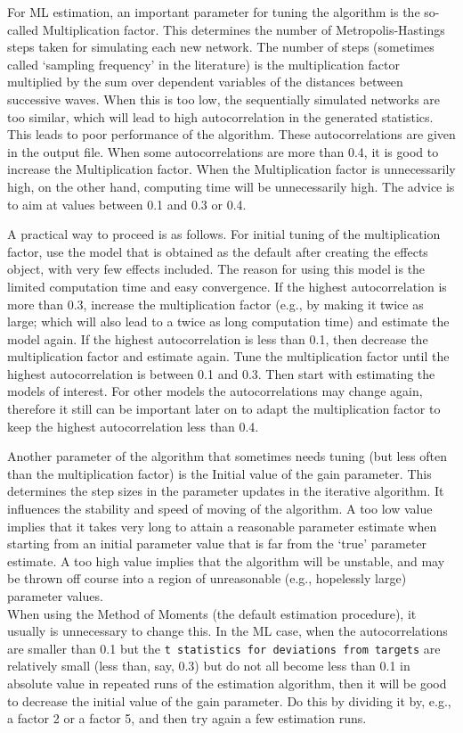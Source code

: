\documentclass[a4paper,fleqn,11pt]{article}
\newcommand{\+}{\, + \,}
\begin{document}
For ML estimation, an important parameter for tuning the
algorithm is the so-called \textsf{Multiplication factor}. This determines
the number of Metropolis-Hastings steps taken
for simulating each new network.
The number of steps (sometimes called `sampling frequency' in the literature)
is the multiplication factor multiplied by the sum over dependent variables
of the distances between successive waves.
When this is too low, the
sequentially simulated networks are too similar, which will
lead to high autocorrelation in the generated statistics.
This leads to poor performance of the algorithm.
These autocorrelations are given in the output file. When some
autocorrelations are more than 0.4, it is good to increase the
\textsf{Multiplication factor}.
When the \textsf{Multiplication factor} is unnecessarily high,
on the other hand, computing time will be unnecessarily high.
The advice is to aim at values between 0.1 and 0.3 or 0.4.

A practical way to proceed is as follows.
For initial tuning of the multiplication factor, use the model that
is obtained as the default after creating the effects object,
with very few effects included. The reason for using this model
is the limited computation time and easy convergence.
If the highest autocorrelation is more than 0.3, increase the
multiplication factor (e.g., by making it twice as large;
which will also lead to a twice as long computation time)
and estimate the model again.
If the highest autocorrelation is less than 0.1, then decrease
the multiplication factor and estimate again.
Tune the multiplication factor until the highest autocorrelation
is between 0.1 and 0.3.
Then start with estimating the models of interest.
For other models the autocorrelations may change again, therefore
it still can be important later on to adapt the multiplication factor
to keep the highest autocorrelation less than 0.4.

Another parameter of the algorithm that sometimes needs tuning
(but less often than the multiplication factor)
is the \textsf{Initial value of the gain parameter}.
This determines the step sizes in the parameter updates in the iterative
algorithm.
It influences the stability and speed of moving of the algorithm.
A too low value implies that it takes very long to attain a
reasonable parameter estimate when starting from an initial
parameter value that is far from the `true' parameter estimate.
A too high value implies that the algorithm will be unstable,
and may be thrown off course into a region of unreasonable
(e.g., hopelessly large) parameter values.\\
When using the Method of Moments
(the default estimation procedure), it usually is unnecessary to change
this. In the ML case, when the autocorrelations are smaller
than 0.1 but the \texttt{t statistics for deviations from targets}
are relatively small (less than, say, 0.3) but do not all become
less than 0.1 in absolute value in repeated runs of the
estimation algorithm, then it will be good to decrease the
\textsf{initial value of the gain parameter}. Do this by dividing
it by, e.g., a factor 2 or a factor 5, and then try again
a few estimation runs.
\end{document}
